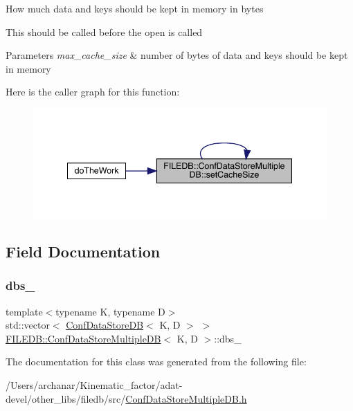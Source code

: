 How much data and keys should be kept in memory in bytes

This should be called before the open is called 
\begin{DoxyParams}{Parameters}
{\em max\+\_\+cache\+\_\+size} & number of bytes of data and keys should be kept in memory \\
\hline
\end{DoxyParams}
Here is the caller graph for this function\+:
\nopagebreak
\begin{figure}[H]
\begin{center}
\leavevmode
\includegraphics[width=341pt]{d3/dc0/classFILEDB_1_1ConfDataStoreMultipleDB_a37115269cf1f8f04c49ab888b040fa13_icgraph}
\end{center}
\end{figure}


\subsection{Field Documentation}
\mbox{\label{classFILEDB_1_1ConfDataStoreMultipleDB_a9f562b5117bbeced1cbcae8498d6a884}} 
\subsubsection{\texorpdfstring{dbs\_}{dbs\_}}
{\footnotesize\ttfamily template$<$typename K, typename D$>$ \\
std\+::vector$<$ \mbox{\hyperlink{classFILEDB_1_1ConfDataStoreDB}{Conf\+Data\+Store\+DB}}$<$ K, D $>$ $>$ \mbox{\hyperlink{classFILEDB_1_1ConfDataStoreMultipleDB}{F\+I\+L\+E\+D\+B\+::\+Conf\+Data\+Store\+Multiple\+DB}}$<$ K, D $>$\+::dbs\+\_\+\hspace{0.3cm}{\ttfamily [protected]}}



The documentation for this class was generated from the following file\+:\begin{DoxyCompactItemize}
\item 
/\+Users/archanar/\+Kinematic\+\_\+factor/adat-\/devel/other\+\_\+libs/filedb/src/\mbox{\hyperlink{adat-devel_2other__libs_2filedb_2src_2ConfDataStoreMultipleDB_8h}{Conf\+Data\+Store\+Multiple\+D\+B.\+h}}\end{DoxyCompactItemize}
